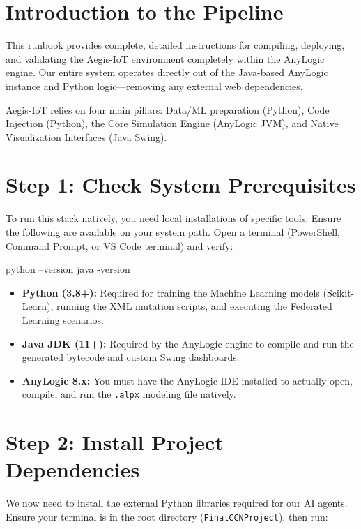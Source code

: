 \documentclass[12pt,a4paper]{article}
\begin{document}
\section*{Introduction to the Pipeline}
This runbook provides complete, detailed instructions for compiling, deploying, and validating the Aegis-IoT environment completely within the AnyLogic engine. Our entire system operates directly out of the Java-based AnyLogic instance and Python logic—removing any external web dependencies.

Aegis-IoT relies on four main pillars: Data/ML preparation (Python), Code Injection (Python), the Core Simulation Engine (AnyLogic JVM), and Native Visualization Interfaces (Java Swing).

\section{Step 1: Check System Prerequisites}

To run this stack natively, you need local installations of specific tools. Ensure the following are available on your system path. Open a terminal (PowerShell, Command Prompt, or VS Code terminal) and verify:

\begin{terminalBox}
python --version
java -version
\end{terminalBox}

\begin{itemize}[leftmargin=*]
    \item \textbf{Python (3.8+):} Required for training the Machine Learning models (Scikit-Learn), running the XML mutation scripts, and executing the Federated Learning scenarios.
    \item \textbf{Java JDK (11+):} Required by the AnyLogic engine to compile and run the generated bytecode and custom Swing dashboards.
    \item \textbf{AnyLogic 8.x:} You must have the AnyLogic IDE installed to actually open, compile, and run the \texttt{.alpx} modeling file natively.
\end{itemize}

\section{Step 2: Install Project Dependencies}

We now need to install the external Python libraries required for our AI agents. Ensure your terminal is in the root directory (\texttt{FinalCCNProject}), then run:
\end{document}
